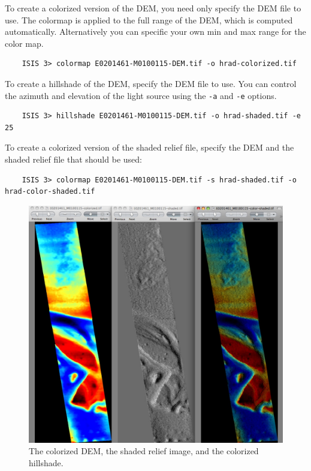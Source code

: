To create a colorized version of the \ac{DEM}, you need only specify
the \ac{DEM} file to use. The colormap is applied to the full range of
the DEM, which is computed automatically.  Alternatively you can
specific your own min and max range for the color map.

\begin{verbatim}
    ISIS 3> colormap E0201461-M0100115-DEM.tif -o hrad-colorized.tif
\end{verbatim}

To create a hillshade of the \ac{DEM}, specify the \ac{DEM} file to
use. You can control the azimuth and elevation of the light source
using the \texttt{-a} and \texttt{-e} options.

\begin{verbatim}
    ISIS 3> hillshade E0201461-M0100115-DEM.tif -o hrad-shaded.tif -e 25
\end{verbatim}

To create a colorized version of the shaded relief file, specify
the \ac{DEM} and the shaded relief file that should be used:

\begin{verbatim}
    ISIS 3> colormap E0201461-M0100115-DEM.tif -s hrad-shaded.tif -o hrad-color-shaded.tif
\end{verbatim}

\begin{figure}[b!]
\begin{center}
\includegraphics[width=4.7in]{images/p19-colorized-shaded.png}
\caption[Hrad colorized and shaded relief]{
    \label{hrad-color}
	The colorized DEM, the shaded relief image, and the colorized hillshade.
    }
\end{center}
\end{figure}

